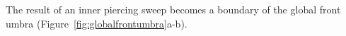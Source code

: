 \documentclass[9pt,twocolumn]{article}
\newif\ifJournal
\begin{document}
\ifJournal
\begin{figure}
\begin{center}
\texttt{[image: img2/cornell1sceneEbitang.jpg]}
\end{center}
\caption{USE THIS EXAMPLE BUT EXPAND TO BE LIKE NEXT FIGURE.}
\end{figure}
\fi



The result of an inner piercing sweep becomes a boundary of the global front umbra
(Figure~\ref{fig:globalfrontumbra}a-b).
\end{document}
